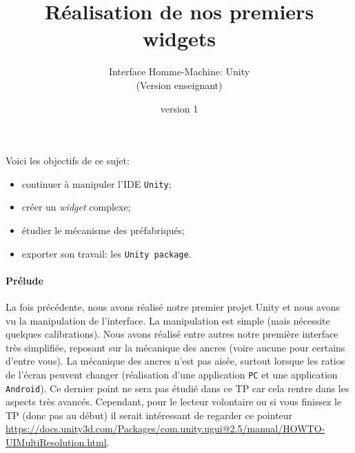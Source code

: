 \documentclass[a4paper,10pt]{article}
\newenvironment{attention}%
{\begin{tcolorbox}[breakable,colback=green!25!white,colframe=red!55!black,title=Attention]}%
{\end{tcolorbox}}
\begin{document}
	


\title{\vspace*{-1cm}Réalisation de nos premiers widgets}
\author{\vspace*{-1.5cm}Interface Homme-Machine: Unity
\begin{ensnote}
	(Version enseignant)
\end{ensnote}
}
\date{\vspace*{-1.5cm}version 1}
\maketitle
\thispagestyle{fancy}

Voici les objectifs de ce sujet:
\begin{itemize}
	\item continuer à manipuler l'IDE \texttt{Unity};
	\item créer un \textit{widget} complexe;
	\item étudier le mécanisme des préfabriqués;
	\item exporter son travail: les \texttt{Unity package}.
\end{itemize}


%	

\paragraph{Prélude}
La fois précédente, nous avons réalisé notre premier projet Unity et nous avons vu la manipulation de l'interface. La manipulation est simple (mais nécessite quelques calibrations). Nous avons réalisé entre autres notre première interface très simplifiée, reposant sur la mécanique des ancres (voire aucune pour certains d'entre vous). La mécanique des ancres n'est pas aisée, surtout lorsque les ratios de l'écran peuvent changer (réalisation d'une application \texttt{PC} et une application \texttt{Android}). Ce dernier point ne sera pas étudié dans ce TP car cela rentre dans les aspects très avancés. Cependant, pour le lecteur volontaire ou si vous finissez le TP (donc pas au début) il serait intéressant de regarder ce pointeur \url{https://docs.unity3d.com/Packages/com.unity.ugui@2.5/manual/HOWTO-UIMultiResolution.html}. 
\end{document}
